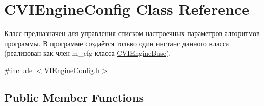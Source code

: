 \hypertarget{class_c_v_i_engine_config}{\section{C\+V\+I\+Engine\+Config Class Reference}
\label{class_c_v_i_engine_config}
}


Класс предназначен для управления списком настроечных параметров алгоритмов программы. В программе создаётся только один инстанс данного класса (реализован как член m\+\_\+cfg класса \hyperlink{class_c_v_i_engine_base}{C\+V\+I\+Engine\+Base}).  




{\ttfamily \#include $<$V\+I\+Engine\+Config.\+h$>$}

\subsection*{Public Member Functions}
